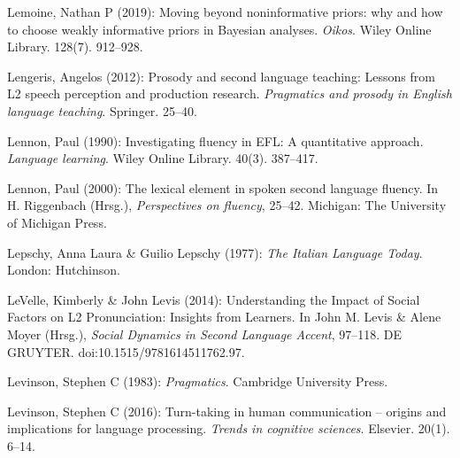 \begin{styleBibliography}
Lemoine, Nathan P (2019): Moving beyond noninformative priors: why and how to choose weakly informative priors in Bayesian analyses. \textit{Oikos}. Wiley Online Library. 128(7). 912–928.
\end{styleBibliography}

\begin{styleBibliography}
Lengeris, Angelos (2012): Prosody and second language teaching: Lessons from L2 speech perception and production research. \textit{Pragmatics and prosody in English language teaching}. Springer. 25–40.
\end{styleBibliography}

\begin{styleBibliography}
Lennon, Paul (1990): Investigating fluency in EFL: A quantitative approach. \textit{Language learning}. Wiley Online Library. 40(3). 387–417.
\end{styleBibliography}

\begin{styleBibliography}
Lennon, Paul (2000): The lexical element in spoken second language fluency. In H. Riggenbach (Hrsg.), \textit{Perspectives on fluency}, 25–42. Michigan: The University of Michigan Press.
\end{styleBibliography}

\begin{styleBibliography}
Lepschy, Anna Laura \& Guilio Lepschy (1977): \textit{The Italian Language Today}. London: Hutchinson.
\end{styleBibliography}

\begin{styleBibliography}
LeVelle, Kimberly \& John Levis (2014): Understanding the Impact of Social Factors on L2 Pronunciation: Insights from Learners. In John M. Levis \& Alene Moyer (Hrsg.), \textit{Social Dynamics in Second Language Accent}, 97–118. DE GRUYTER. doi:10.1515/9781614511762.97.
\end{styleBibliography}

\begin{styleBibliography}
Levinson, Stephen C (1983): \textit{Pragmatics}. Cambridge University Press.
\end{styleBibliography}

\begin{styleBibliography}
Levinson, Stephen C (2016): Turn-taking in human communication – origins and implications for language processing. \textit{Trends in cognitive sciences}. Elsevier. 20(1). 6–14.
\end{styleBibliography}

